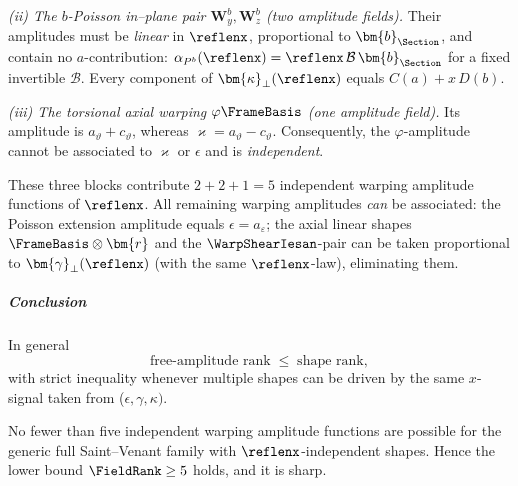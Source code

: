 \medskip
\emph{(ii) The \(b\)-Poisson in–plane pair \(\bm{W}^b_y,\bm{W}^b_z\) (two amplitude fields).}
Their amplitudes must be \emph{linear} in \(\reflenx\), proportional to \(\bm{b}_{\Section}\), and contain no \(a\)-contribution:
\(\alpha_{P^b}(\reflenx)=\reflenx \,\mathcal{B}\,\bm{b}_{\Section}\) for a fixed invertible \(\mathcal{B}\).
Every component of \(\bm{\kappa}_\perp(\reflenx)\) equals \(C(a)+x\,D(b)\).

\medskip
\emph{(iii) The torsional axial warping \(\varphi\FrameBasis\) (one amplitude field).}
Its amplitude is \(a_\vartheta+c_\vartheta\), whereas \(\varkappa=a_\vartheta-c_\vartheta\).
Consequently, the \(\varphi\)-amplitude cannot be associated to \(\varkappa\) or \(\epsilon\) and is \emph{independent}.

\medskip
These three blocks contribute \(2+2+1=5\) independent warping amplitude functions of \(\reflenx\). 
All remaining warping amplitudes \emph{can} be associated:
the Poisson extension amplitude equals \(\epsilon=a_\varepsilon\);
the axial linear shapes \(\FrameBasis\otimes\bm{r}\) and the \(\WarpShearIesan\)-pair can be taken proportional to
\(\bm{\gamma}_\perp(\reflenx)\) (with the same \(\reflenx\)-law), eliminating them.

\subparagraph{Conclusion}

In general
\[
\text{free‑amplitude rank} \;\le\; \text{shape rank},
\]
with strict inequality whenever multiple shapes can be driven by the same \(x\)-signal taken from (\(\epsilon,\gamma,\kappa)\).

No fewer than five independent warping amplitude functions are possible for the generic full Saint–Venant family with \(\reflenx\)-independent shapes.
Hence the lower bound \(\FieldRank \ge 5\) holds, and it is sharp.

